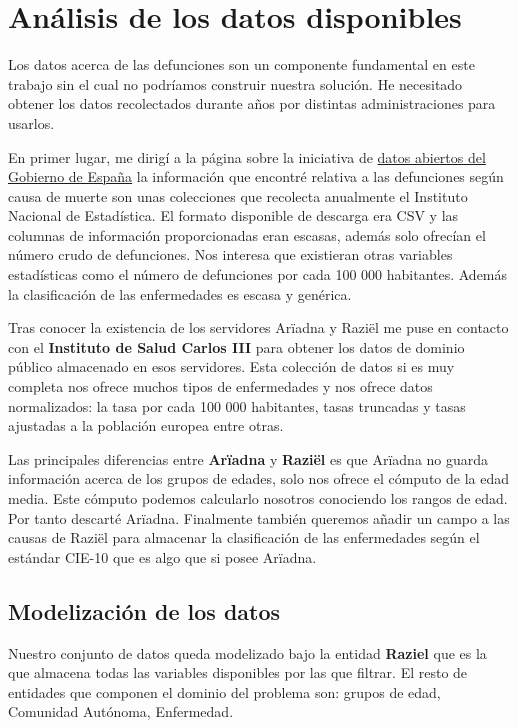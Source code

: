 \chapter{Análisis de los datos disponibles}

Los datos acerca de las defunciones son un componente fundamental en este trabajo sin
el cual no podríamos construir nuestra solución. He necesitado obtener los datos recolectados
durante años por distintas administraciones para usarlos.

En primer lugar, me dirigí a la página sobre la iniciativa de \href{https://datos.gob.es/}{datos abiertos del Gobierno de España}
la información que encontré relativa a las defunciones
según causa de muerte son unas colecciones que recolecta anualmente el Instituto
Nacional de Estadística. El formato disponible de descarga era CSV y las columnas de información
proporcionadas eran escasas, además solo ofrecían el número crudo de defunciones. Nos interesa que existieran
otras variables estadísticas como el número de defunciones por cada 100 000 habitantes. Además la clasificación de
las enfermedades es escasa y genérica.

Tras conocer la existencia de los servidores Arïadna y Raziël me puse en contacto con el \textbf{Instituto de Salud Carlos
III} para obtener los datos de dominio público almacenado en esos servidores. Esta colección de datos si es muy completa
nos ofrece muchos tipos de enfermedades y nos ofrece datos normalizados: la tasa por cada 100 000 habitantes, tasas truncadas y
tasas ajustadas a la población europea entre otras.

Las principales diferencias entre \textbf{Arïadna} y \textbf{Raziël} es que Arïadna no guarda información acerca
de los grupos de edades, solo nos ofrece el cómputo de la edad media. Este cómputo podemos calcularlo nosotros conociendo
los rangos de edad. Por tanto descarté Arïadna.
Finalmente también queremos añadir un campo a las causas de Raziël para almacenar la clasificación de las 
enfermedades según el estándar \gls{CIE-10} que es algo que si posee Arïadna.

\section{Modelización de los datos}
Nuestro conjunto de datos queda modelizado bajo la entidad \textbf{Raziel} que es la que almacena todas las variables
disponibles por las que filtrar. El resto de entidades que componen el dominio del problema son: grupos de edad,
Comunidad Autónoma, Enfermedad.
